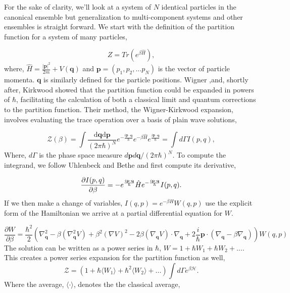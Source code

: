 For the sake of clarity, we'll look at a system of $N$ identical particles in the canonical ensemble but generalization to multi-component systems and other ensembles is straight forward. 
We start with the definition of the partition function for a system of many particles,  

\begin{equation}
    Z = Tr(e^{\beta \hat{H}}),
\end{equation} 
where, $\hat{H} = \frac{\vert\mathbf{p}\vert^2}{2m} + V(\mathbf{q})$ and $\mathbf{p} = (p_1, p_2, ...p_N)$ is the vector of particle momenta. 
$\mathbf{q}$ is similarly defined for the particle positions.
Wigner \cite{PhysRev.40.749},and, shortly after, Kirkwood \cite{PhysRev.44.31} showed that the partition function could be expanded in powers of $\hbar$, facilitating the calculation of both a classical limit and quantum corrections to the partition function.
Their method, the Wigner-Kirkwood expansion, involves evaluating the trace operation over a basis of plain wave solutions,

\begin{equation}
	\mathcal{Z}(\beta) = \int 
		\frac{\mathrm{d}\mathbf{q} \mathrm{d}\mathbf{p}}{(2\pi \hbar)^N}
		e^{-\frac{i\mathbf{p}\cdot\mathbf{q}}{\hbar}}
		e^{-\beta \hat{H}}
		e^{\frac{i\mathbf{p}\cdot\mathbf{q}}{\hbar}} = \int d\Gamma I(p, q),
\end{equation}
Where, $d\Gamma$ is the phase space measure $d\mathbf{p}d\mathbf{q}/(2\pi\hbar)^N$. To compute the integrand, we follow Uhlenbeck and Bethe \cite{Uhlenbeck1936729} and first compute its derivative,

\begin{equation}
	\frac{\partial I(p, q)}{\partial \beta} = -e^{\frac{i\mathbf{p}\cdot\mathbf{q}}{\hbar}}\hat{H}e^{-\frac{i\mathbf{p}\cdot\mathbf{q}}{\hbar}} I(p, q).
\end{equation}
If we then make a change of variables, $I(q, p) = e^{-\beta H}W(q, p)$ use the explicit form of the Hamiltonian we arrive at a partial differential equation for $W$.

\begin{equation}
	\frac{\partial W}{\partial \beta} = \frac{\hbar^2}{2} \left(
		\nabla_{\mathbf{q}}^2 - 
		\beta(\nabla_{\mathbf{q}}^2V) + 
		\beta^2(\nabla V)^2 -
		2\beta(\nabla_{\mathbf{q}} V)\cdot\nabla_{\mathbf{q}} + 
		2 \frac{i}{\hbar}\mathbf{p}\cdot(\nabla_{\mathbf{q}} - \beta\nabla_{\mathbf{q}})
	\right)W(q, p)
\end{equation}
The solution can be written as a power series in $\hbar$, $W = 1 + \hbar W_1 + \hbar W_2 + ...$.
This creates a power series expansion for the partition function as well,
\begin{equation}
    \mathcal{Z} = (1 + \hbar \langle W_1 \rangle + \hbar^2 \langle W_2\rangle + ...) 
    \int d\Gamma e^{\beta\mathcal{H}}.
\end{equation}
Where the average, $\langle \cdot \rangle$, denotes the the classical average, 

